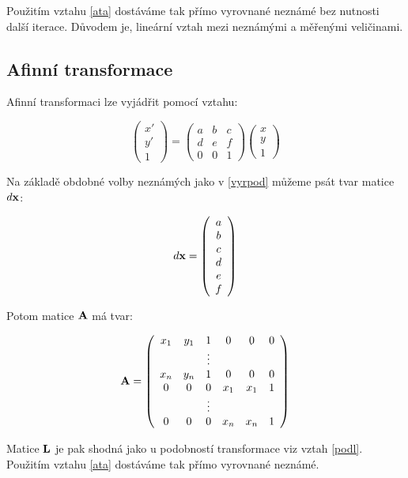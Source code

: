 Použitím vztahu \ref{ata} dostáváme tak přímo vyrovnané neznámé bez nutnosti
další iterace. Důvodem je, lineární vztah mezi neznámými a měřenými veličinami.

\subsection{Afinní transformace}
\label{vyraf}
Afinní transformaci lze vyjádřit pomocí vztahu:

$$\left(
\begin{array}{c}
x'\\
y'\\ 
1
\end{array}
\right) 
= 
\left(
\begin{array}{ccc}
a & b & c\\
d & e & f\\ 
0 & 0 & 1
\end{array}
\right) 
\left(
\begin{array}{c}
x\\
y\\ 
1
\end{array}
\right)
$$

Na základě obdobné volby neznámých jako v \ref{vyrpod}
můžeme psát tvar matice $d{\bf x}$:

$$ d{\bf x} =
\left(
\begin{array}{c}
a\\
b\\
c\\
d\\
e\\
f
\end{array}
\right) $$

Potom matice ${\bf A}$ má tvar:

$$
{\bf A}=
\left(
\begin{array}{cccccc}
x_{1} & y_{1} & 1  &  0    & 0      & 0 \\
    &       & \vdots  &       &     &   \\
x_{n} & y_{n} & 1  &  0    & 0      & 0 \\
   0  & 0     & 0  & x_{1} &  x_{1} & 1 \\
      &       & \vdots  &       &   &   \\
   0  & 0     & 0  & x_{n} &  x_{n} & 1
\end{array}
\right)
$$

Matice ${\bf L}$ je pak shodná jako u podobností transformace viz vztah
\ref{podl}. Použitím vztahu \ref{ata} dostáváme tak přímo vyrovnané
neznámé.

